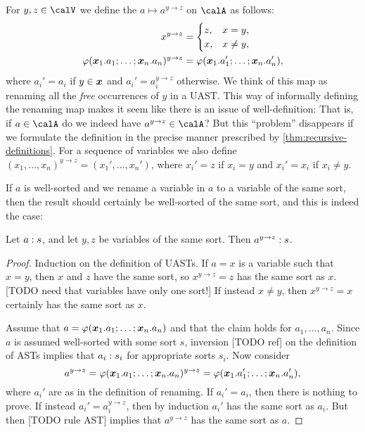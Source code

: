 \documentclass[a4paper, 11pt, article, danish, oneside]{memoir}
\renewcommand{\phi}{\varphi}
\newcommand{\setVar}{\calV}
\begin{document}
For $y,z \in \setVar$ we define the  $a \mapsto a^{y \to z}$ on $\calA$ as follows:
%
\begin{align*}
    x^{y \to z}
        &= \begin{cases}
            z, & x = y, \\
            x, & x \neq y,
        \end{cases} \\
    \phi(\seq{x}_1.a_1 ; \ldots ; \seq{x}_n.a_n)^{y \to z}
        &= \phi(\seq{x}_1.a_1' ; \ldots ; \seq{x}_n.a_n'),
\end{align*}
%
where $a_i' = a_i$ if $y \in \bm{x}$ and $a_i' = a_i^{y \to z}$ otherwise. We think of this map as renaming all the \emph{free} occurrences of $y$ in a UAST. This way of informally defining the renaming map makes it seem like there is an issue of well-definition: That is, if $a \in \calA$ do we indeed have $a^{y \to z} \in \calA$? But this \enquote{problem} disappears if we formulate the definition in the precise manner prescribed by \cref{thm:recursive-definitions}. For a sequence of variables we also define $(x_1, \ldots, x_n)^{y \to z} = (x_1', \ldots, x_n')$, where $x_i' = z$ if $x_i = y$ and $x_i' = x_i$ if $x_i \neq y$.

If $a$ is well-sorted and we rename a variable in $a$ to a variable of the same sort, then the result should certainly be well-sorted of the same sort, and this is indeed the case:

\begin{lemma}
    \label{lem:renaming-sorts}
    Let $a : s$, and let $y,z$ be variables of the same sort. Then $a^{y \to z} : s$.
\end{lemma}

\begin{proof}
    Induction on the definition of UASTs. If $a = x$ is a variable such that $x = y$, then $x$ and $z$ have the same sort, so $x^{y \to z} = z$ has the same sort as $x$. [TODO need that variables have only one sort!] If instead $x \neq y$, then $x^{y \to z} = x$ certainly has the same sort as $x$.

    Assume that $a = \phi(\seq{x}_1.a_1 ; \ldots ; \seq{x}_n.a_n)$ and that the claim holds for $a_1, \ldots, a_n$. Since $a$ is assumed well-sorted with some sort $s$, inversion [TODO ref] on the definition of ASTs implies that $a_i : s_i$ for appropriate sorts $s_i$. Now consider
    \begin{equation*}
        a^{y \to z}
            = \phi(\seq{x}_1.a_1 ; \ldots ; \seq{x}_n.a_n)^{y \to z}
            = \phi(\seq{x}_1.a_1' ; \ldots ; \seq{x}_n.a_n'),
    \end{equation*}
    where $a_i'$ are as in the definition of renaming. If $a_i' = a_i$, then there is nothing to prove. If instead $a_i' = a_i^{y \to z}$, then by induction $a_i'$ has the same sort as $a_i$. But then [TODO rule AST] implies that $a^{y \to z}$ has the same sort as $a$.
\end{proof}
\end{document}
